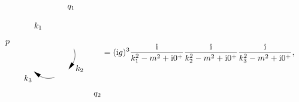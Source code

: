\begin{equation}
\begin{gathered}
\begin{tikzpicture}[x=0.75pt,y=0.75pt,yscale=-1,xscale=1]
            \draw  [draw opacity=0] (267.88,140.82) .. controls (268.94,143.47) and (269.59,146.31) .. (269.75,149.29) .. controls (270.13,156.4) and (267.66,163.06) .. (263.27,168.33) -- (238.47,150.96) -- cycle ; \draw   (267.88,140.82) .. controls (268.94,143.47) and (269.59,146.31) .. (269.75,149.29) .. controls (270.13,156.4) and (267.66,163.06) .. (263.27,168.33) ;
            \draw    (263.27,168.33) -- (260.42,172.29) ;
            \draw [shift={(259.26,173.92)}, rotate = 305.67] [fill={rgb, 255:red, 0; green, 0; blue, 0 }  ][line width=0.08]  [draw opacity=0] (12,-3) -- (0,0) -- (12,3) -- cycle    ;
            
            \draw  [draw opacity=0] (236.87,186.62) .. controls (234.19,187.61) and (231.33,188.19) .. (228.35,188.27) .. controls (221.23,188.47) and (214.64,185.84) .. (209.48,181.32) -- (227.47,156.96) -- cycle ; \draw   (236.87,186.62) .. controls (234.19,187.61) and (231.33,188.19) .. (228.35,188.27) .. controls (221.23,188.47) and (214.64,185.84) .. (209.48,181.32) ;
            \draw    (209.48,181.32) -- (205.59,178.37) ;
            \draw [shift={(203.99,177.16)}, rotate = 397.11] [fill={rgb, 255:red, 0; green, 0; blue, 0 }  ][line width=0.08]  [draw opacity=0] (12,-3) -- (0,0) -- (12,3) -- cycle    ;
            
            
            \draw (162.29,136.95) node [anchor=south] [inner sep=0.75pt]    {$p$};
            \draw (270.71,80.16) node [anchor=south east] [inner sep=0.75pt]    {$q_{1}$};
            \draw (298,219.78) node [anchor=south west] [inner sep=0.75pt]    {$q_{2}$};
            \draw (218.71,111.13) node [anchor=south east] [inner sep=0.75pt]    {$k_{1}$};
            \draw (269.27,165.73) node [anchor=north west][inner sep=0.75pt]    {$k_{2}$};
            \draw (187.27,181.73) node [anchor=north west][inner sep=0.75pt]    {$k_{3}$};
            \end{tikzpicture}
    \end{gathered} = (\ii g)^3 \frac{\ii}{k_1^2 - m^2 + \ii 0^+} \frac{\ii}{k_2^2 - m^2 + \ii 0^+} \frac{\ii}{k_3^2 - m^2 + \ii 0^+},
    \label{eq:phi-phiphi-no-integral-one-loop}
\end{equation}